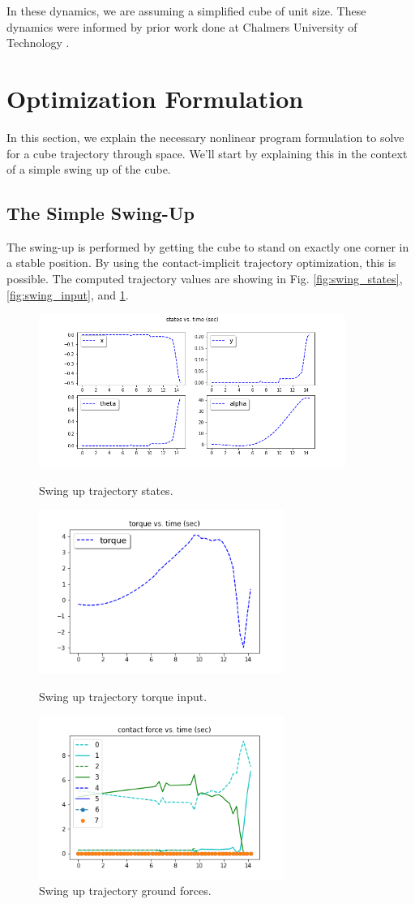 \documentclass[conference]{IEEEtran}
\begin{document}
In these dynamics, we are assuming a simplified cube of unit size. These dynamics were informed by prior work done at Chalmers University of Technology \cite{b4}.


\section{Optimization Formulation}
In this section, we explain the necessary nonlinear program formulation to solve for a cube trajectory through space. We'll start by explaining this in the context of a simple swing up of the cube.

\subsection{The Simple Swing-Up}
The swing-up is performed by getting the cube to stand on exactly one corner in a stable position. By using the contact-implicit trajectory optimization, this is possible. The computed trajectory values are showing in Fig. \ref{fig:swing_states}, \ref{fig:swing_input}, and \ref{fig:swing_ground}.

\begin{figure}[htbp]
\centerline{\includegraphics[width=10cm,keepaspectratio]{media/swing_up/swing_up_states.png}}
\caption{Swing up trajectory states.}
\label{fig:swing_states}
\centerline{\includegraphics[width=8cm,keepaspectratio]{media/swing_up/swing_up_torque.png}}
\caption{Swing up trajectory torque input.}
\label{fig:swing_input}
\centerline{\includegraphics[width=8cm,keepaspectratio]{media/swing_up/swing_up_ground_forces.png}}
\caption{Swing up trajectory ground forces.}
\label{fig:swing_ground}
\end{figure}
\end{document}
